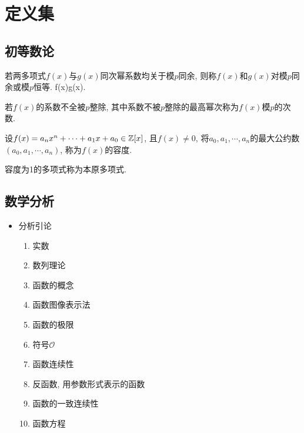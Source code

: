 \chapter{定义集}

\section{初等数论}
若两多项式$f(x)$与$g(x)$同次幂系数均关于模$p$同余, 则称$f(x)$和$g(x)$对模$p$同余或模$p$恒等.
\bee
f(x)\equiv g(x).
\eee
\ed

若$f(x)$的系数不全被$p$整除, 其中系数不被$p$整除的最高幂次称为$f(x)$模$p$的次数.
\ed

设$f(x)=a_nx^n+\cdots+a_1x+a_0\in\Bbb Z[x]$, 且$f(x)\ne0$, 将$a_0,a_1,\cdots,a_n$的最大公约数$(a_0,a_1,\cdots,a_n)$, 称为$f(x)$的容度.

容度为1的多项式称为本原多项式.
\ed

\section{数学分析}
\begin{itemize}
 \item 分析引论
 \begin{enumerate}[1.]
  \item 实数
  \item 数列理论
  \item 函数的概念
  \item 函数图像表示法
  \item 函数的极限
  \item 符号$\mathscr{O}$
  \item 函数连续性
  \item 反函数, 用参数形式表示的函数
  \item 函数的一致连续性
  \item 函数方程
 \end{enumerate}
\end{itemize}
\ed

